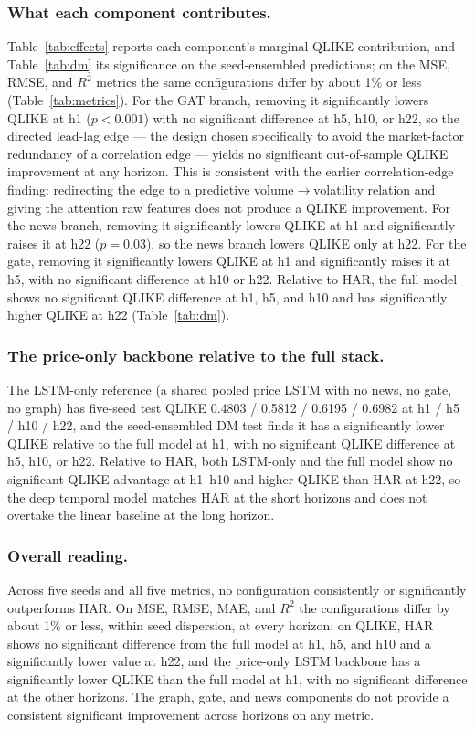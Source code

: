 \documentclass[runningheads]{llncs}
\begin{document}
\subsubsection{What each component contributes.}
Table~\ref{tab:effects} reports each component's marginal QLIKE contribution, and Table~\ref{tab:dm} its
significance on the seed-ensembled predictions; on the MSE, RMSE, and $R^2$ metrics the same configurations
differ by about 1\% or less (Table~\ref{tab:metrics}). For the GAT branch, removing it significantly lowers
QLIKE at h1 ($p<0.001$) with no significant difference at h5, h10, or h22, so the directed lead-lag edge
--- the design chosen specifically to avoid the market-factor redundancy of a correlation edge --- yields no
significant out-of-sample QLIKE improvement at any horizon. This is consistent with the earlier
correlation-edge finding: redirecting the edge to a predictive volume$\to$volatility relation and giving the
attention raw features does not produce a QLIKE improvement. For the news branch, removing it significantly
lowers QLIKE at h1 and significantly raises it at h22 ($p=0.03$), so the news branch lowers QLIKE only at
h22. For the gate, removing it significantly lowers QLIKE at h1 and significantly raises it at h5, with no
significant difference at h10 or h22. Relative to HAR, the full model shows no significant QLIKE difference
at h1, h5, and h10 and has significantly higher QLIKE at h22 (Table~\ref{tab:dm}).

\subsubsection{The price-only backbone relative to the full stack.}
The LSTM-only reference (a shared pooled price LSTM with no news, no gate, no graph) has five-seed test
QLIKE 0.4803 / 0.5812 / 0.6195 / 0.6982 at h1 / h5 / h10 / h22, and the seed-ensembled DM test finds it has
a significantly lower QLIKE relative to the full model at h1, with no significant QLIKE difference at h5,
h10, or h22. Relative to HAR, both LSTM-only and the full model show no significant QLIKE advantage at
h1--h10 and higher QLIKE than HAR at h22, so the deep temporal model matches HAR at the short horizons and
does not overtake the linear baseline at the long horizon.

\subsubsection{Overall reading.}
Across five seeds and all five metrics, no configuration consistently or significantly outperforms HAR. On
MSE, RMSE, MAE, and $R^2$ the configurations differ by about 1\% or less, within seed dispersion, at every
horizon; on QLIKE, HAR shows no significant difference from the full model at h1, h5, and h10 and a
significantly lower value at h22, and the price-only LSTM backbone has a significantly lower QLIKE than the
full model at h1, with no significant difference at the other horizons. The graph, gate, and news
components do not provide a consistent significant improvement across horizons on any metric.
\end{document}
